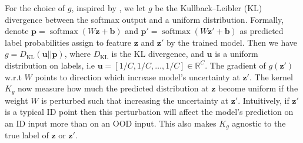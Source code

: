 \documentclass[nohyperref]{article}
\theoremstyle{plain}
\theoremstyle{definition}
\theoremstyle{remark}
\begin{document}
For the choice of $g$, inspired by \citet{huang2021on}, we let $g$ be the Kullback–Leibler (KL) divergence between the softmax output and a uniform distribution. 
Formally, denote $\mathbf{p} = \operatorname{softmax}(W\mathbf{z} + \mathbf{b})$ and $\mathbf{p}' = \operatorname{softmax}(W\mathbf{z}' + \mathbf{b})$ as predicted label probabilities assign to feature $\mathbf{z}$ and $\mathbf{z}'$ by the trained model.
Then we have $g = D_{\text{KL}} (\mathbf{u} || \mathbf{p})$, where $D_{\text{KL}}$ is the KL divergence,
and $\mathbf{u}$ is a uniform distribution on labels, i.e $\mathbf{u}= [1/C,1/C,\dots,1/C] \in \mathbb{R}^C$.
The gradient of $g(\mathbf{z}')$ w.r.t $W$ points to direction which increase model's uncertainty at $\mathbf{z}'$.
The kernel $K_g$ now measure how much the predicted distribution at $\mathbf{z}$ become uniform if the weight $W$ is perturbed such that increasing the uncertainty at $\mathbf{z}'$.
Intuitively, if $\mathbf{z}'$ is a typical ID point then this perturbation will affect the model's prediction on an ID input more than on an OOD input. This also makes $K_g$ agnostic to the true label of $\mathbf{z}$ or $\mathbf{z}'$.
\end{document}
